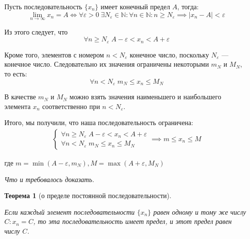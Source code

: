 \documentclass[a4paper,12pt,oneside]{extbook}
\newcommand{\newpar}{$ $\par\nobreak\ignorespaces}
\theoremstyle{numbered}
\theoremstyle{unnumbered}
\newtheorem*{theorem*}{Теорема}
\theoremstyle{named}
\theoremstyle{unnumbered}
\theoremstyle{named}
\theoremstyle{named}
\theoremstyle{named}
\renewenvironment{proof}[1][]{\breakenv[Доказательство]{\if\relax\detokenize{#1}\relax\else\;\fi}{\textbf{#1}}}{\smallskip\newpar \hfill\textit{Что и требовалось доказать.}}
\begin{document}
\begin{proof}
    Пусть последовательность \(\{x_n\}\) имеет конечный предел \(A\), тогда:
    \[
        \lim_{n \to \infty}{x_n} = A \iff
        \forall \varepsilon > 0 \; \exists N_{\varepsilon} \in \mathbb{N}: \forall n \in \mathbb{N}: n \geq N_{\varepsilon} \implies |x_n - A| < \varepsilon
    \]

    Из этого следует, что
    \[
        \forall n \geq N_{\varepsilon} \; A - \varepsilon < x_n < A + \varepsilon
    \]

    Кроме того, элементов с номером \(n < N_{\varepsilon}\) конечное число, поскольку \(N_{\varepsilon}\) — конечное число. Следовательно их значения ограничены некоторыми \(m_N\) и \(M_N\), то есть:
    \[
        \forall n < N_{\varepsilon} \; m_N \leq x_n \leq M_N
    \]

    В качестве \(m_N\) и \(M_N\) можно взять значения наименьшего и наибольшего элемента \(x_n\) соответственно при \(n < N_{\varepsilon}\).

    Итого, мы получили, что наша последовательность ограничена:
    \begin{gather*}
        \begin{cases}
            \forall n \geq N_{\varepsilon} \; A - \varepsilon < x_n < A + \varepsilon \\
            \forall n < N_{\varepsilon} \; m_N \leq x_n \leq M_N
        \end{cases}
        \implies
        m \leq x_n \leq M
    \end{gather*}

    где \(m = \min(A - \varepsilon, m_N), M = \max(A + \varepsilon, M_N)\)
\end{proof}

\begin{theorem*}[о пределе постоянной последовательности]
    \newpar
    Если каждый элемент последовательности \(\{x_n\}\) равен одному и тому же числу \(C: x_n = C\), то эта последовательность имеет предел, и этот предел равен числу \(C\).
\end{theorem*}
\end{document}
